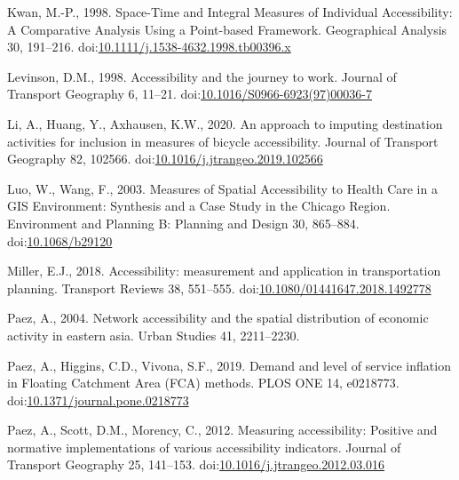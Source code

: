 \documentclass[]{elsarticle} %
\newlength{\cslhangindent}
\newlength{\cslentryspacingunit} %
\newenvironment{CSLReferences}[2] %
 {%
  \setlength{\parindent}{0pt}
  \ifodd #1
  \let\oldpar\par
  \def\par{\hangindent=\cslhangindent\oldpar}
  \fi
  \setlength{\parskip}{#2\cslentryspacingunit}
 }%
 {}
\begin{document}
\begin{CSLReferences}{1}{0}
\leavevmode{}%
Kwan, M.-P., 1998. Space-{Time} and {Integral} {Measures} of
{Individual} {Accessibility}: {A} {Comparative} {Analysis} {Using} a
{Point}-based {Framework}. Geographical Analysis 30, 191--216.
doi:\href{https://doi.org/10.1111/j.1538-4632.1998.tb00396.x}{10.1111/j.1538-4632.1998.tb00396.x}

\leavevmode{}%
Levinson, D.M., 1998. Accessibility and the journey to work. Journal of
Transport Geography 6, 11--21.
doi:\href{https://doi.org/10.1016/S0966-6923(97)00036-7}{10.1016/S0966-6923(97)00036-7}

\leavevmode{}%
Li, A., Huang, Y., Axhausen, K.W., 2020. An approach to imputing
destination activities for inclusion in measures of bicycle
accessibility. Journal of Transport Geography 82, 102566.
doi:\href{https://doi.org/10.1016/j.jtrangeo.2019.102566}{10.1016/j.jtrangeo.2019.102566}

\leavevmode{}%
Luo, W., Wang, F., 2003. Measures of Spatial Accessibility to Health
Care in a GIS Environment: Synthesis and a Case Study in the Chicago
Region. Environment and Planning B: Planning and Design 30, 865--884.
doi:\href{https://doi.org/10.1068/b29120}{10.1068/b29120}

\leavevmode{}%
Miller, E.J., 2018. Accessibility: measurement and application in
transportation planning. Transport Reviews 38, 551--555.
doi:\href{https://doi.org/10.1080/01441647.2018.1492778}{10.1080/01441647.2018.1492778}

\leavevmode{}%
Paez, A., 2004. Network accessibility and the spatial distribution of
economic activity in eastern asia. Urban Studies 41, 2211--2230.

\leavevmode{}%
Paez, A., Higgins, C.D., Vivona, S.F., 2019. Demand and level of service
inflation in Floating Catchment Area (FCA) methods. PLOS ONE 14,
e0218773.
doi:\href{https://doi.org/10.1371/journal.pone.0218773}{10.1371/journal.pone.0218773}

\leavevmode{}%
Paez, A., Scott, D.M., Morency, C., 2012. Measuring accessibility:
Positive and normative implementations of various accessibility
indicators. Journal of Transport Geography 25, 141--153.
doi:\href{https://doi.org/10.1016/j.jtrangeo.2012.03.016}{10.1016/j.jtrangeo.2012.03.016}


\end{CSLReferences}
\end{document}
